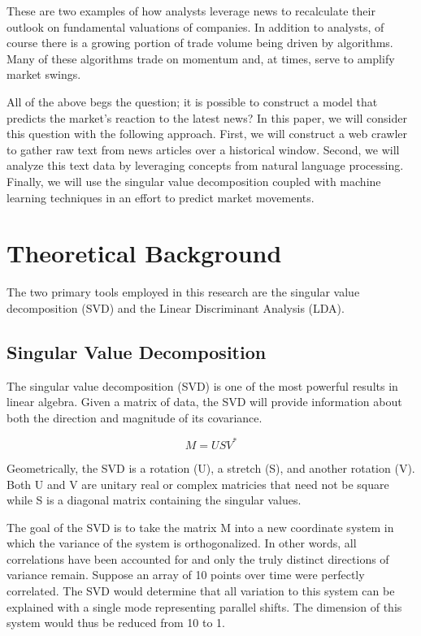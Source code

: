 \documentclass{article}
\begin{document}
These are two examples of how analysts leverage news to recalculate their outlook on fundamental valuations of companies.  In addition to analysts, of course there is a growing portion of trade volume being driven by algorithms.  Many of these algorithms trade on momentum and, at times, serve to amplify market swings.  

All of the above begs the question; it is possible to construct a model that predicts the market’s reaction to the latest news?  In this paper, we will consider this question with the following approach.  First, we will construct a web crawler to gather raw text from news articles over a historical window.  Second, we will analyze this text data by leveraging concepts from natural language processing.  Finally, we will use the singular value decomposition coupled with machine learning techniques in an effort to predict market movements.





\section{Theoretical Background}
The two primary tools employed in this research are the singular value decomposition (SVD) and the Linear Discriminant Analysis (LDA).

\subsection{Singular Value Decomposition}
The singular value decomposition (SVD) is one of the most powerful results in linear algebra.  Given a matrix of data, the SVD will provide information about both the direction and magnitude of its covariance.  

\begin{equation}
M = USV^*
\end{equation}


Geometrically, the SVD is a rotation (U), a stretch (S), and another rotation (V).  Both U and V are unitary real or complex matricies that need not be square while S is a diagonal matrix containing the singular values.  

The goal of the SVD is to take the matrix M into a new coordinate system in which the variance of the system is orthogonalized.  In other words, all correlations have been accounted for and only the truly distinct directions of variance remain.  Suppose an array of 10 points over time were perfectly correlated.  The SVD would determine that all variation to this system can be explained with a single mode representing parallel shifts.  The dimension of this system would thus be reduced from 10 to 1.
\end{document}

